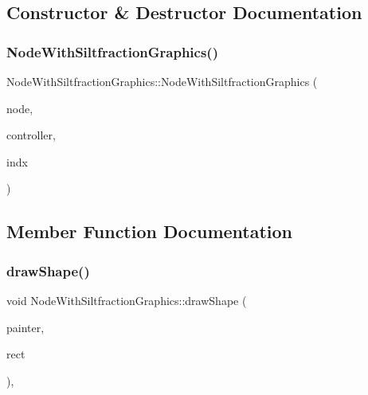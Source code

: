 \subsection{Constructor \& Destructor Documentation}
\mbox{\label{class_node_with_siltfraction_graphics_a13029d4119482fe5977424c3cd551d15}} 
\subsubsection{\texorpdfstring{NodeWithSiltfractionGraphics()}{NodeWithSiltfractionGraphics()}}
{\footnotesize\ttfamily Node\+With\+Siltfraction\+Graphics\+::\+Node\+With\+Siltfraction\+Graphics (\begin{DoxyParamCaption}\item[{\mbox{\hyperlink{class_node_data}{Node\+Data}} $\ast$}]{node,  }\item[{\mbox{\hyperlink{class_map_objects_controller}{Map\+Objects\+Controller}} $\ast$}]{controller,  }\item[{int}]{indx }\end{DoxyParamCaption})\hspace{0.3cm}{\ttfamily [inline]}}



\subsection{Member Function Documentation}
\mbox{\label{class_node_with_siltfraction_graphics_ad498aedce039d84e20250885ecfba2c2}} 
\subsubsection{\texorpdfstring{drawShape()}{drawShape()}}
{\footnotesize\ttfamily void Node\+With\+Siltfraction\+Graphics\+::draw\+Shape (\begin{DoxyParamCaption}\item[{Q\+Painter \&}]{painter,  }\item[{const qmapcontrol\+::\+Rect\+World\+Px \&}]{rect }\end{DoxyParamCaption})\hspace{0.3cm}{\ttfamily [protected]}, {\ttfamily [virtual]}}



